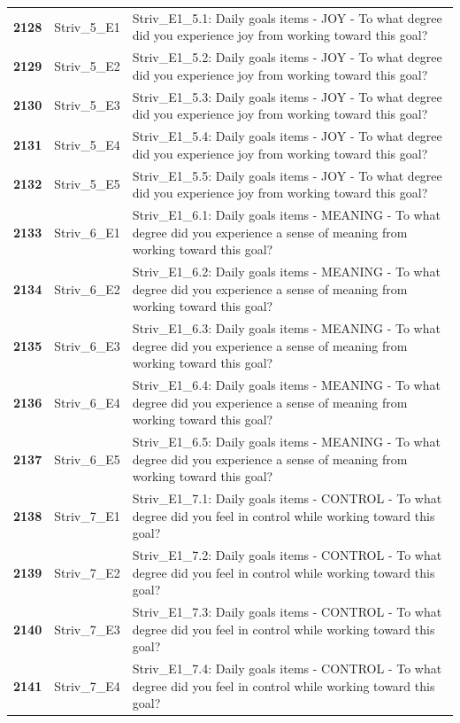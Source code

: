 \documentclass[
  letterpaper,
  DIV=11,
  numbers=noendperiod]{scrartcl}
\begin{document}
\begin{longtable}[t]{>{}cll}
\textbf{2128} & Striv\_5\_E1 & Striv\_E1\_5.1: Daily goals items - JOY - To what degree did you experience joy from working toward this goal?\\
\textbf{2129} & Striv\_5\_E2 & Striv\_E1\_5.2: Daily goals items - JOY - To what degree did you experience joy from working toward this goal?\\
\textbf{2130} & Striv\_5\_E3 & Striv\_E1\_5.3: Daily goals items - JOY - To what degree did you experience joy from working toward this goal?\\
\addlinespace
\textbf{2131} & Striv\_5\_E4 & Striv\_E1\_5.4: Daily goals items - JOY - To what degree did you experience joy from working toward this goal?\\
\textbf{2132} & Striv\_5\_E5 & Striv\_E1\_5.5: Daily goals items - JOY - To what degree did you experience joy from working toward this goal?\\
\textbf{2133} & Striv\_6\_E1 & Striv\_E1\_6.1: Daily goals items - MEANING - To what degree did you experience a sense of meaning from working toward this goal?\\
\textbf{2134} & Striv\_6\_E2 & Striv\_E1\_6.2: Daily goals items - MEANING - To what degree did you experience a sense of meaning from working toward this goal?\\
\textbf{2135} & Striv\_6\_E3 & Striv\_E1\_6.3: Daily goals items - MEANING - To what degree did you experience a sense of meaning from working toward this goal?\\
\addlinespace
\textbf{2136} & Striv\_6\_E4 & Striv\_E1\_6.4: Daily goals items - MEANING - To what degree did you experience a sense of meaning from working toward this goal?\\
\textbf{2137} & Striv\_6\_E5 & Striv\_E1\_6.5: Daily goals items - MEANING - To what degree did you experience a sense of meaning from working toward this goal?\\
\textbf{2138} & Striv\_7\_E1 & Striv\_E1\_7.1: Daily goals items - CONTROL - To what degree did you feel in control while working toward this goal?\\
\textbf{2139} & Striv\_7\_E2 & Striv\_E1\_7.2: Daily goals items - CONTROL - To what degree did you feel in control while working toward this goal?\\
\textbf{2140} & Striv\_7\_E3 & Striv\_E1\_7.3: Daily goals items - CONTROL - To what degree did you feel in control while working toward this goal?\\
\addlinespace
\textbf{2141} & Striv\_7\_E4 & Striv\_E1\_7.4: Daily goals items - CONTROL - To what degree did you feel in control while working toward this goal?\\

\end{longtable}
\end{document}
